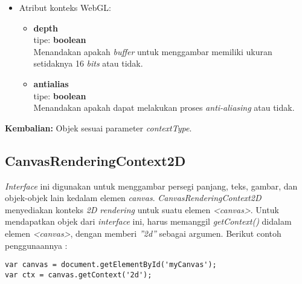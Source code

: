 \begin{itemize}
\begin{itemize}
\begin{itemize}
			\item Atribut konteks WebGL:
			\begin{itemize}
				\item \textbf{depth} \\ tipe: \textbf{boolean} \\ Menandakan apakah \textit{buffer} untuk menggambar memiliki ukuran setidaknya 16 \textit{bits} atau tidak.
				\item \textbf{antialias} \\tipe: \textbf{boolean} \\ Menandakan apakah dapat melakukan proses \textit{anti-aliasing} atau tidak.
			\end{itemize}
		\end{itemize}
	\end{itemize}
	\textbf{Kembalian:} Objek sesuai parameter \textit{contextType}.
	
\end{itemize}


\subsection{CanvasRenderingContext2D}
\textit{Interface} ini digunakan untuk menggambar persegi panjang, teks, gambar, dan objek-objek lain kedalam elemen \textit{canvas}. \textit{CanvasRenderingContext2D} menyediakan konteks \textit{2D rendering} untuk suatu elemen \textit{<canvas>}.
Untuk mendapatkan objek dari \textit{interface} ini, harus memanggil \textit{getContext()} didalam elemen \textit{<canvas>}, dengan memberi \textit{''2d''} sebagai argumen. Berikut contoh penggunaannya :

\begin{lstlisting}
var canvas = document.getElementById('myCanvas');
var ctx = canvas.getContext('2d');
\end{lstlisting}

